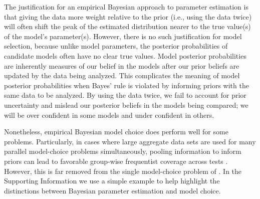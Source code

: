 The justification for an empirical Bayesian approach to parameter estimation is
that giving the data more weight relative to the prior (i.e., using the data
twice) will often shift the peak of the estimated distribution nearer to the
true value(s) of the model's parameter(s).
However, there is no such justification for model selection, because unlike
model parameters, the posterior probabilities of candidate models often have no
clear true values.
Model posterior probabilities are inherently measures of our belief in the
models after our prior beliefs are updated by the data being analyzed.
This complicates the meaning of model posterior probabilities when Bayes' rule
is violated by informing priors with the same data to be analyzed.
By using the data twice, we fail to account for prior uncertainty and mislead
our posterior beliefs in the models being compared; we will be over confident
in some models and under confident in others.

Nonetheless, empirical Bayesian model choice does perform well for some
problems.
Particularly, in cases where large aggregate data sets are used for many
parallel model-choice problems simultaneously, pooling information to inform
priors can lead to favorable group-wise frequentist coverage across tests
\citep{Efron2008}.
However, this is far removed from the single model-choice problem of \msb.
In the Supporting Information we use a simple example to help highlight the
distinctions between Bayesian parameter estimation and model choice.


